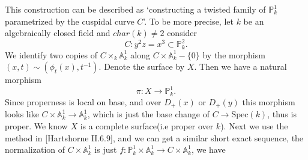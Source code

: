 \documentclass[../main.tex]{subfiles}
\begin{document}
\begin{example}
This construction can be described as `constructing a twisted family of $\mathbb{P}_{k}^{1}$ parametrized by the cuspidal curve $C$'. To be more precise, let $k$ be an algebraically closed field and $char(k)\neq 2$ consider 
$$C: y^{2}z=x^{3}\subset \mathbb{P}_{k}^{2}.$$
We identify two copies of $C\times_{k}\mathbb{A}_{k}^{1}$ along $C\times \mathbb{A}_{k}^{1}-\{0\}$ by the morphism $(x,t)\sim (\phi_{t}(x),t^{-1})$. Denote the surface by $X$. Then we have a natural morphism 
$$\pi: X\rightarrow \mathbb{P}_{k}^{1}.$$
Since properness is local on base, and over $D_{+}(x)$ or $D_{+}(y)$ this morphism looks like $C\times \mathbb{A}_{k}^{1}\rightarrow \mathbb{A}_{k}^{1}$, which is just the base change of $C\rightarrow \mathrm{Spec}(k)$, thus is proper. We know $X$ is a complete surface(i.e proper over $k$). Next we use the method in [Hartshorne $\mathrm{II}.6.9$], and we can get a similar short exact sequence, the normalization of $C\times \mathbb{A}_{k}^{1}$ is just $f:\mathbb{P}_{k}^{1}\times \mathbb{A}_{k}^{1}\rightarrow C\times \mathbb{A}_{k}^{1}$, we have 


\end{example}
\end{document}
